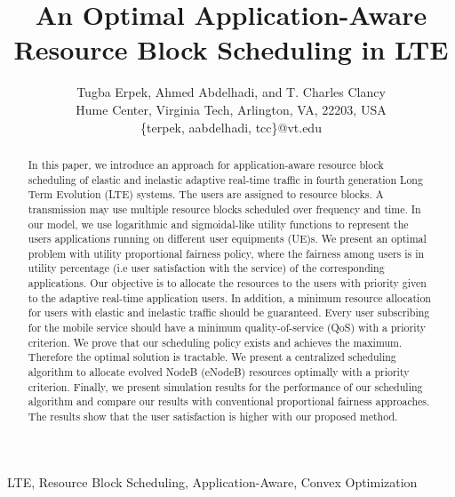\documentclass[conference]{IEEEtran}
\begin{document}
\title{An Optimal Application-Aware Resource Block Scheduling in LTE}
\author{Tugba Erpek, Ahmed Abdelhadi, and T. Charles Clancy \\
Hume Center, Virginia Tech, Arlington, VA, 22203, USA\\
\{terpek, aabdelhadi, tcc\}@vt.edu
}
\maketitle

\begin{abstract}
In this paper, we introduce an approach for application-aware resource block scheduling of elastic and inelastic adaptive real-time traffic in fourth generation Long Term Evolution (LTE) systems. The users are assigned to resource blocks. A transmission may use multiple resource blocks scheduled over frequency and time. In our model, we use logarithmic and sigmoidal-like utility functions to represent the users applications running on different user equipments (UE)s. We present an optimal problem with utility proportional fairness policy, where the fairness among users is in utility percentage (i.e user satisfaction with the service) of the corresponding applications. Our objective is to allocate the resources to the users with priority given to the adaptive real-time application users. In addition, a minimum resource allocation for users with elastic and inelastic traffic should be guaranteed. Every user subscribing for the mobile service should have a minimum quality-of-service (QoS) with a priority criterion. We prove that our scheduling policy exists and achieves the maximum. Therefore the optimal solution is tractable. We present a centralized scheduling algorithm to allocate evolved NodeB (eNodeB) resources optimally with a priority criterion. Finally, we present simulation results for the performance of our scheduling algorithm and compare our results with conventional proportional fairness approaches. The results show that the user satisfaction is higher with our proposed method.
\end{abstract}

\begin{keywords}
LTE, Resource Block Scheduling, Application-Aware, Convex Optimization
\end{keywords}
\providelength{\AxesLineWidth}       \setlength{\AxesLineWidth}{0.5pt}\providelength{\plotwidth}           \setlength{\plotwidth}{8cm}\providelength{\LineWidth}           \setlength{\LineWidth}{0.7pt}\providelength{\MarkerSize}          \setlength{\MarkerSize}{3pt}
\end{document}
